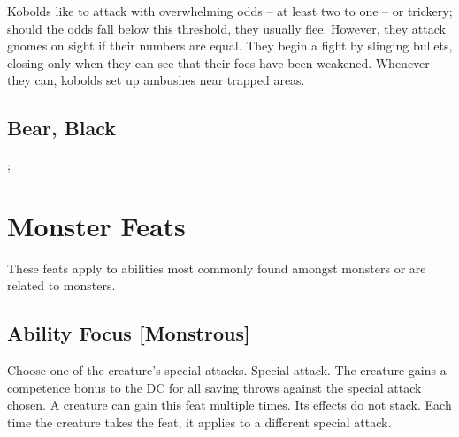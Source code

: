 Kobolds like to attack with overwhelming odds -- at least two to one -- or trickery; should the odds fall below this threshold, they usually flee. However, they attack gnomes on sight if their numbers are equal.
They begin a fight by slinging bullets, closing only when they can see that their foes have been weakened. Whenever they can, kobolds set up ambushes near trapped areas.

\subsection{Bear, Black}
; %

\monlinerule 


\monlinerule


\monlinerule 


\monlinerule



\section{Monster Feats}

These feats apply to abilities most commonly found amongst monsters or are related to monsters.

\subsection{Ability Focus [Monstrous]}
Choose one of the creature's special attacks.
 Special attack.
 The creature gains a  competence bonus to the DC for all saving throws against the special attack chosen.
 A creature can gain this feat multiple times. Its effects do not stack. Each time the creature takes the feat, it applies to a different special attack.

